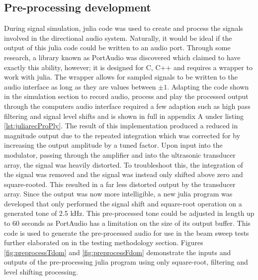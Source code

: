 \subsection{Pre-processing development}
During signal simulation, julia code was used to create and process the signals involved in the directional audio system. Naturally, it would be ideal if the output of this julia code could be written to an audio port. Through some research, a library known as PortAudio was discovered which claimed to have exactly this ability, however; it is designed for C, C++ and requires a wrapper to work with julia. The wrapper \cite{russell_2016} allows for sampled signals to be written to the audio interface as long as they are values between $\pm1$. Adapting the code shown in the simulation section to record audio, process and play the processed output through the computers audio interface required a few adaption such as high pass filtering and signal level shifts and is shown in full in appendix A under listing \ref{lst:juliarecProPly}.
The result of this implementation produced a reduced in magnitude output due to the repeated integration which was corrected for by increasing the output amplitude by a tuned factor. Upon input into the modulator, passing through the amplifier and into the ultrasonic transducer array, the signal was heavily distorted. To troubleshoot this, the integration of the signal was removed and the signal was instead only shifted above zero and square-rooted. This resulted in a far less distorted output by the transducer array.
Since the output was now more intelligible, a new julia program was developed that only performed the signal shift and square-root operation on a generated tone of 2.5 kHz. This pre-processed tone could be adjusted in length up to 60 seconds as PortAudio has a limitation on the size of its output buffer. This code is used to generate the pre-processed audio for use in the beam sweep tests further elaborated on in the testing methodology section.
Figures \ref{fig:preprocessTdom} and \ref{fig:preprocessFdom} demonstrate the inputs and outputs of the pre-processing julia program using only square-root, filtering and level shifting processing.

